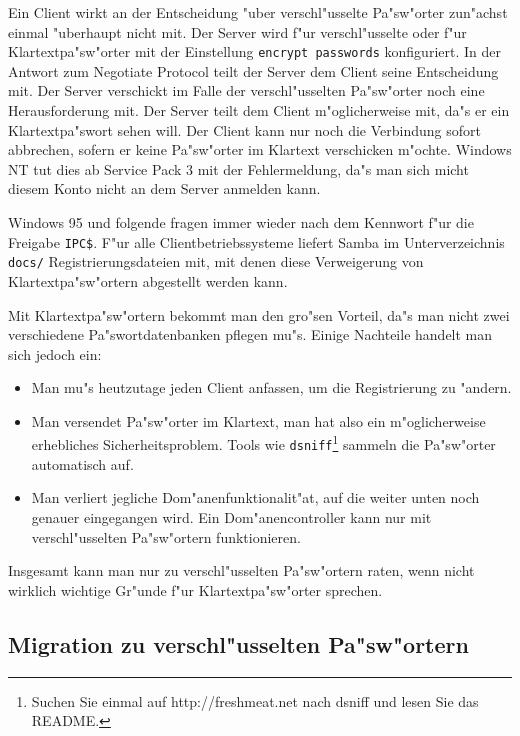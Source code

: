 \documentclass{scrartcl}\usepackage{pslatex}\typearea{12}
\newcommand{\prog}{\texttt}
\newcommand{\param}{\texttt}
\newcommand{\dateistyle}{\texttt}
\begin{document}
Ein Client wirkt an der Entscheidung "uber verschl"usselte Pa"sw"orter
zun"achst einmal "uberhaupt nicht mit. Der Server wird f"ur
verschl"usselte oder f"ur Klartextpa"sw"orter mit der Einstellung
\param{encrypt passwords} konfiguriert. In der Antwort zum Negotiate
Protocol teilt der Server dem Client seine Entscheidung mit. Der
Server verschickt im Falle der verschl"usselten Pa"sw"orter noch eine
Herausforderung mit. Der Server teilt dem Client m"oglicherweise mit,
da"s er ein Klartextpa"swort sehen will. Der Client kann nur noch die
Verbindung sofort abbrechen, sofern er keine Pa"sw"orter im Klartext
verschicken m"ochte. Windows NT tut dies ab Service Pack 3 mit der
Fehlermeldung, da"s man sich micht diesem Konto nicht an dem Server
anmelden kann. 

\begin{center}
\end{center}

Windows 95 und folgende fragen immer wieder nach dem Kennwort f"ur die
Freigabe \texttt{IPC\$}. F"ur alle Clientbetriebssysteme liefert Samba
im Unterverzeichnis \dateistyle{docs/} Registrierungsdateien mit, mit
denen diese Verweigerung von Klartextpa"sw"ortern abgestellt werden
kann.

Mit Klartextpa"sw"ortern bekommt man den gro"sen Vorteil, da"s man
nicht zwei verschiedene Pa"swortdatenbanken pflegen mu"s. Einige
Nachteile handelt man sich jedoch ein:

\begin{itemize}
\item Man mu"s heutzutage jeden Client anfassen, um die Registrierung
  zu "andern.
\item Man versendet Pa"sw"orter im Klartext, man hat also ein
  m"oglicherweise erhebliches Sicherheitsproblem. Tools wie
  \prog{dsniff}\footnote{Suchen Sie einmal auf http://freshmeat.net
    nach dsniff und lesen Sie das README.} sammeln die Pa"sw"orter
  automatisch auf.
\item Man verliert jegliche Dom"anenfunktionalit"at, auf die weiter
  unten noch genauer eingegangen wird. Ein Dom"anencontroller kann nur
  mit verschl"usselten Pa"sw"ortern funktionieren.
\end{itemize}

Insgesamt kann man nur zu verschl"usselten Pa"sw"ortern raten, wenn
nicht wirklich wichtige Gr"unde f"ur Klartextpa"sw"orter sprechen.

\subsection{Migration zu verschl"usselten Pa"sw"ortern}
\end{document}
